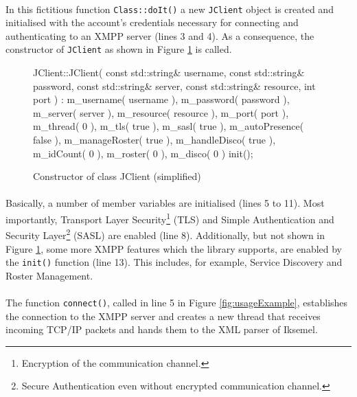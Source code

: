 \paragraph{}
In this fictitious function \texttt{Class::doIt()} a new \texttt{JClient} object is created and initialised with the account's credentials necessary for connecting and authenticating to an XMPP server (lines 3 and 4). As a consequence, the constructor of \texttt{JClient} as shown in Figure \ref{fig:JClientConstructor} is called.

\begin{figure}[H]
\begin{listing}{1}
JClient::JClient( const std::string& username,
                  const std::string& password,
                  const std::string& server,
                  const std::string& resource, int port )
  : m_username( username ), m_password( password ),
  m_server( server ), m_resource( resource ),
  m_port( port ), m_thread( 0 ),
  m_tls( true ), m_sasl( true ),
  m_autoPresence( false ), m_manageRoster( true ),
  m_handleDisco( true ), m_idCount( 0 ), m_roster( 0 ),
  m_disco( 0 )
{
  init();
}
\end{listing}
\caption{Constructor of class JClient (simplified)}
\label{fig:JClientConstructor}
\end{figure}

\paragraph{}
Basically, a number of member variables are initialised (lines 5 to 11). Most importantly, Transport Layer Security\footnote{Encryption of the communication channel.} (TLS) \cite{rfc2246} and Simple Authentication and Security Layer\footnote{Secure Authentication even without encrypted communication channel.} (SASL) \cite{rfc2222} are enabled (line 8). Additionally, but not shown in Figure \ref{fig:JClientConstructor}, some more XMPP features which the library supports, are enabled by the \texttt{init()} function (line 13). This includes, for example, Service Discovery and Roster Management.

\paragraph{}
The function \texttt{connect()}, called in line 5 in Figure \ref{fig:usageExample}, establishes the connection to the XMPP server and creates a new thread that receives incoming TCP/IP packets and hands them to the XML parser of Iksemel.


